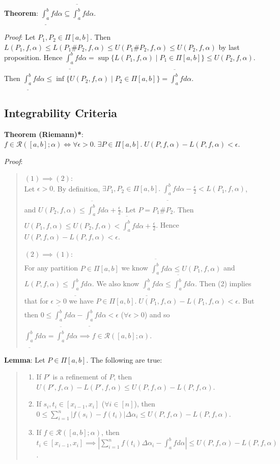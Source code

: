 \documentclass[11pt]{article}
\begin{document}
\textbf{Theorem}: $\underline{\int_a^b} f d\alpha \subseteq \overline{\int_a^b} f d \alpha$.

\emph{Proof}: Let $P_1, P_2 \in \Pi[a,b]$. Then $L(P_1, f, \alpha) \leq L(P_1 \# P_2, f, \alpha) \leq U(P_1 \# P_2, f, \alpha) \leq U(P_2, f, \alpha)$ by last proposition. Hence $\underline{\int_a^b} f d\alpha = \sup\{L(P_1, f, \alpha) \mid P_1 \in \Pi[a,b]\} \leq U(P_2, f, \alpha)$. Then $\underline{\int_a^b} f d\alpha \leq \inf \{U(P_2, f, \alpha) \mid P_2 \in \Pi[a,b]\} = \overline{\int_a^b} f d\alpha$.

\subsection{Integrability Criteria}

\textbf{Theorem (Riemann)*}: $f \in \mathcal{R}([a,b]; \alpha) \iff \forall \epsilon > 0.\; \exists P \in \Pi[a,b].\; U(P, f, \alpha) - L(P, f, \alpha) < \epsilon$.

\emph{Proof}:
\begin{quote}\vspace{-0.3cm}
$(1) \implies (2)$:\\
Let $\epsilon > 0$. By definition, $\exists P_1, P_2 \in \Pi[a,b].\; \underline{\int_a^b} f d\alpha - \frac{\epsilon}{2} < L(P_1, f, \alpha)$, and $U(P_2, f, \alpha) \leq \overline{\int_a^b} f d\alpha + \frac{\epsilon}{2}$. Let $P = P_1 \# P_2$. Then $U(P_1, f, \alpha) \leq U(P_2, f, \alpha) < \overline{\int_a^b} f d\alpha + \frac{\epsilon}{2}$. Hence $U(P, f, \alpha) - L(P, f , \alpha) < \epsilon$.

$(2) \implies (1)$:\\
For any partition $P \in \Pi[a,b]$ we know $\overline{\int_a^b} f d\alpha \leq U(P_1, f, \alpha)$ and $L(P, f, \alpha) \leq \underline{\int_a^b} f d\alpha$. We also know $\underline{\int_a^b} f d\alpha \leq \overline{\int_a^b} f d\alpha$. Then (2) implies that for $\epsilon > 0$ we have $P \in \Pi[a,b].\; U(P_1, f, \alpha) - L(P_1, f, \alpha) < \epsilon$. But then $0 \leq \overline{\int_a^b} f d\alpha - \underline{\int_a^b} f d\alpha < \epsilon$ ($\forall \epsilon > 0$) and so $\underline{\int_a^b} f d\alpha = \overline{\int_a^b} f d\alpha \implies f \in \mathcal{R}([a,b]; \alpha)$.
\end{quote}

\textbf{Lemma}: Let $P \in \Pi[a,b]$. The following are true:
\begin{quote}\vspace{-0.3cm}
	\begin{enumerate}
	\item If $P'$ is a refinement of $P$, then $U(P', f, \alpha) - L(P', f, \alpha) \leq U(P, f, \alpha) - L(P, f, \alpha)$.
	\item If $s_i, t_i \in [x_{i-1}, x_i]$ ($\forall i \in [n]$), then $0 \leq \sum_{i=1}^n |f(s_i) - f(t_i)| \Delta \alpha_i \leq U(P, f, \alpha) - L(P, f, \alpha)$.
	\item If $f \in \mathcal{R}([a,b]; \alpha)$, then $t_i \in [x_{i-1}, x_i] \implies |\sum_{i=1}^n f(t_i) \Delta \alpha_i - \int_a^b f d\alpha| \leq U(P, f, \alpha) - L(P, f, \alpha)$.
	\end{enumerate}
\end{quote}
\end{document}
